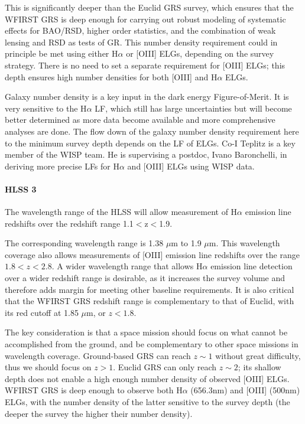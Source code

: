  This is significantly deeper than the Euclid GRS survey, which ensures that the
 WFIRST GRS is deep enough for carrying out robust modeling of systematic effects
 for BAO/RSD, higher order statistics, and the combination of weak lensing and
 RSD as tests of GR. This number density requirement could in principle be met
 using either H$\alpha$ or [OIII] ELGs, depending on the survey strategy. There is no
 need to set a separate requirement for [OIII] ELGs; this depth ensures high
 number densities for both [OIII] and H$\alpha$ ELGs.

 Galaxy number density is a key input in the dark energy Figure-of-Merit. It
 is very sensitive to the H$\alpha$ LF, which still has large uncertainties but will
 become better determined as more data become available and more comprehensive
 analyses are done. The flow down of the galaxy number density requirement here
 to the minimum survey depth depends on the LF of ELGs.
 Co-I Teplitz is a key member of the WISP team. He is supervising a postdoc, Ivano Baronchelli, in deriving more precise LFs for H$\alpha$ and [OIII] ELGs using WISP data.

\paragraph{HLSS 3} The wavelength range of the HLSS will allow measurement of
H$\alpha$ emission line redshifts over the redshift range 1.1$<$z$<$1.9.

 The corresponding wavelength range is 1.38 $\mu$m to 1.9 $\mu$m.  This wavelength
 coverage also allows measurements of [OIII] emission line redshifts over the
 range $1.8 < z < 2.8$.  A wider wavelength range that allows H$\alpha$ emission line
 detection over a wider redshift range is desirable, as it increases the survey
 volume and therefore adds margin for meeting other baseline requirements.  It is
 also critical that the WFIRST GRS redshift range is complementary to that of
 Euclid, with its red cutoff at 1.85 $\mu$m, or $z < 1.8$.

 The key consideration is that a space mission should focus on what cannot be
 accomplished from the ground, and be complementary to other space missions in
 wavelength coverage. Ground-based GRS can reach $z\sim1$ without great difficulty,
 thus we should focus on $z>1$. Euclid GRS can only reach $z \sim2$; its shallow depth
 does not enable a high enough number density of observed [OIII] ELGs. WFIRST GRS
 is deep enough to observe both H$\alpha$ (656.3nm) and [OIII] (500nm) ELGs, with the
 number density of the latter sensitive to the survey depth (the deeper the
 survey the higher their number density).

